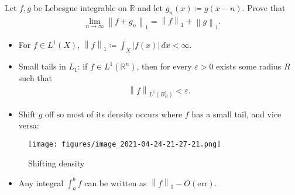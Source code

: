 Let \(f, g\) be Lebesgue integrable on \({\mathbb{R}}\) and let
\(g_n(x) \coloneqq g(x- n)\). Prove that
\begin{align*}
\lim_{n\to \infty } {\left\lVert {f + g_n} \right\rVert}_1 = {\left\lVert {f} \right\rVert}_1 + {\left\lVert {g} \right\rVert}_1
.\end{align*}

\begin{concept}

\envlist

\begin{itemize}
\item
  For \(f\in L^1(X)\),
  \({\left\lVert {f} \right\rVert}_1 \coloneqq\int_X {\left\lvert {f(x)} \right\rvert} \,dx< \infty\).
\item
  Small tails in \(L_1\): if \(f\in L^1({\mathbb{R}}^n)\), then for
  every \(\varepsilon>0\) exists some radius \(R\) such that
  \begin{align*}
  {\left\lVert {f} \right\rVert}_{L^1(B_R^c)} < \varepsilon
  .\end{align*}
\item
  Shift \(g\) off so most of its density occurs where \(f\) has a small
  tail, and vice versa:
\end{itemize}

\begin{figure}
\centering
\texttt{[image: figures/image\_2021-04-24-21-27-21.png]}
\caption{Shifting density}
\end{figure}

\begin{itemize}
\tightlist
\item
  Any integral \(\int_a^b f\) can be written as
  \({\left\lVert {f} \right\rVert}_1 - O(\text{err})\).
\end{itemize}

\end{concept}

